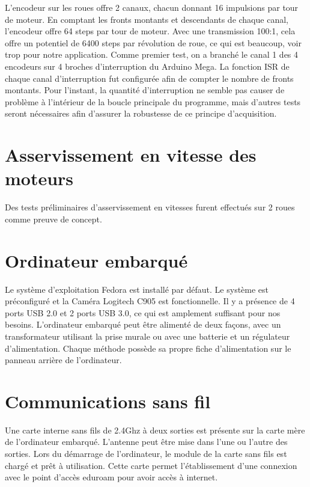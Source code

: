 L'encodeur sur les roues offre 2 canaux, chacun donnant 16 impulsions par tour de moteur. En comptant les fronts montants et descendants de chaque canal, l'encodeur offre 64 steps par tour de moteur. Avec une transmission 100:1, cela offre un potentiel de 6400 steps par révolution de roue, ce qui est beaucoup, voir trop pour notre application.  Comme premier test, on a branché le canal 1 des 4 encodeurs sur 4 broches d'interruption du Arduino Mega. La fonction ISR de chaque canal d'interruption fut configurée afin de compter le nombre de fronts montants. Pour l'instant, la quantité d'interruption ne semble pas causer de problème à l'intérieur de la boucle principale du programme, mais d'autres tests seront nécessaires afin d'assurer la robustesse de ce principe d'acquisition.

\section{Asservissement en vitesse des moteurs}

Des tests préliminaires d'asservissement en vitesses furent effectués sur 2 roues comme preuve de concept. 



\section{Ordinateur embarqué}
 Le système d’exploitation Fedora est installé par défaut. Le système est préconfiguré et la Caméra Logitech C905 est fonctionnelle.  Il y a présence de 4 ports USB 2.0 et 2 ports USB 3.0, ce qui est amplement suffisant pour nos besoins. L’ordinateur embarqué peut être alimenté de deux façons, avec un transformateur utilisant la prise murale ou avec une batterie et un régulateur d’alimentation. Chaque méthode possède sa propre fiche d’alimentation sur le panneau arrière de l’ordinateur. 

\section{Communications sans fil}
 Une carte interne sans fils de 2.4Ghz à deux sorties est présente sur la carte mère de l’ordinateur embarqué. L’antenne peut être mise dans l’une ou l’autre des sorties. Lors du démarrage de l’ordinateur, le module de la carte sans fils est chargé et prêt à utilisation. Cette carte permet l’établissement d’une connexion avec le point d’accès eduroam pour avoir accès à internet. 
 
